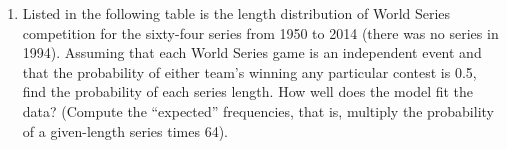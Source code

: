 \begin{enumerate}
    \underline{Sol}:\\
    $$
    \begin{aligned}
      & \text{Parameters: } \\
      & n = 25 \\
      & p = \frac{30}{500} = 0.06 \\
      \\
      & \text{Bunker is destroyed if } X \ge 3: \\
      & P(X \ge 3) = 1 - \sum_{k=0}^{2} \binom{25}{k} (0.06)^k (0.94)^{25-k} \\
      & P(X=0) = \binom{25}{0} (0.06)^0 (0.94)^{25} \approx 0.2129 \\
      & P(X=1) = \binom{25}{1} (0.06)^1 (0.94)^{24} \approx 0.3398 \\
      & P(X=2) = \binom{25}{2} (0.06)^2 (0.94)^{23} \approx 0.2602 \\
      \\
      & P(X \ge 3) = 1 - (0.2129 + 0.3398 + 0.2602) \\
      & P(X \ge 3) = 1 - 0.8129 \approx \boxed{0.1871}
    \end{aligned}$$

  \item[16.] Listed in the following table is the length distribution
    of World Series competition for the sixty-four series from 1950
    to 2014 (there was no series in 1994). Assuming that each World
    Series game is an independent event and that the probability of
    either team’s winning any particular contest is 0.5, find the
    probability of each series length. How well does the model fit
    the data? (Compute the “expected” frequencies, that is, multiply
    the probability of a given-length series times 64).


\end{enumerate}
